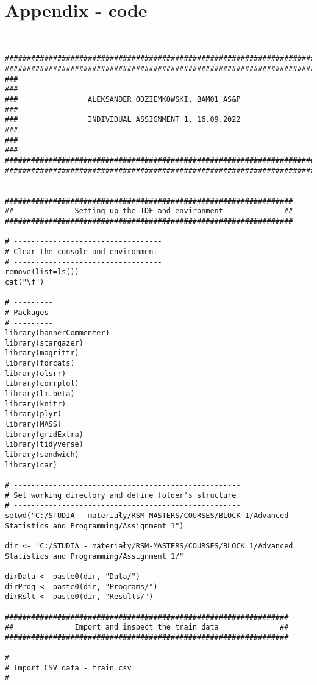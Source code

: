 \documentclass{article}
\begin{document}
\section{Appendix - code}
\begin{tiny}
\begin{verbatim}


############################################################################
############################################################################
###                                                                      ###
###                ALEKSANDER ODZIEMKOWSKI, BAM01 AS&P                   ###
###                INDIVIDUAL ASSIGNMENT 1, 16.09.2022                   ###
###                                                                      ###
############################################################################
############################################################################


##################################################################
##              Setting up the IDE and environment              ##
##################################################################

# ----------------------------------
# Clear the console and environment
# ----------------------------------
remove(list=ls())
cat("\f")

# ---------
# Packages
# ---------
library(bannerCommenter)
library(stargazer)
library(magrittr)
library(forcats)
library(olsrr)
library(corrplot)
library(lm.beta)
library(knitr)
library(plyr)
library(MASS)
library(gridExtra)
library(tidyverse)
library(sandwich)
library(car)

# ----------------------------------------------------
# Set working directory and define folder's structure
# ----------------------------------------------------
setwd("C:/STUDIA - materiały/RSM-MASTERS/COURSES/BLOCK 1/Advanced Statistics and Programming/Assignment 1")

dir <- "C:/STUDIA - materiały/RSM-MASTERS/COURSES/BLOCK 1/Advanced Statistics and Programming/Assignment 1/"

dirData <- paste0(dir, "Data/")
dirProg <- paste0(dir, "Programs/")
dirRslt <- paste0(dir, "Results/")

#################################################################
##              Import and inspect the train data              ##
#################################################################

# ----------------------------
# Import CSV data - train.csv
# ----------------------------


\end{verbatim}
\end{tiny}
\end{document}

